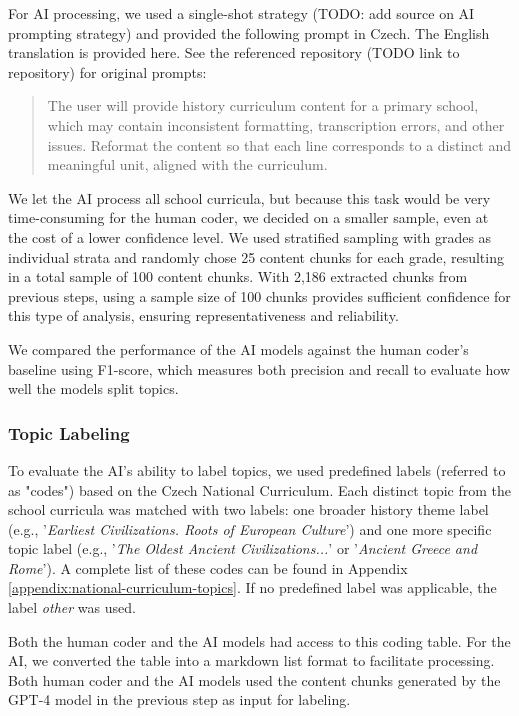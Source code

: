 \documentclass[]{interact}
\theoremstyle{plain}%
\theoremstyle{definition}
\theoremstyle{remark}
\begin{document}
For AI processing, we used a single-shot strategy (TODO: add source on AI prompting strategy) and provided the following prompt in Czech. The English translation is provided here. See the referenced repository (TODO link to repository) for original prompts:

\begin{quotation}
    The user will provide history curriculum content for a primary school, which may contain inconsistent formatting, transcription errors, and other issues. Reformat the content so that each line corresponds to a distinct and meaningful unit, aligned with the curriculum.
\end{quotation}


We let the AI process all school curricula, but because this task would be very time-consuming for the human coder, we decided on a smaller sample, even at the cost of a lower confidence level. We used stratified sampling with grades as individual strata and randomly chose 25 content chunks for each grade, resulting in a total sample of 100 content chunks. With 2,186 extracted chunks from previous steps, using a sample size of 100 chunks provides sufficient confidence for this type of analysis, ensuring representativeness and reliability.

We compared the performance of the AI models against the human coder’s baseline using F1-score, which measures both precision and recall to evaluate how well the models split topics.


\subsubsection{Topic Labeling}

To evaluate the AI’s ability to label topics, we used predefined labels (referred to as "codes") based on the Czech National Curriculum. Each distinct topic from the school curricula was matched with two labels: one broader history theme label (e.g., '\textit{Earliest Civilizations. Roots of European Culture}') and one more specific topic label (e.g., '\textit{The Oldest Ancient Civilizations...}' or '\textit{Ancient Greece and Rome}'). A complete list of these codes can be found in Appendix \ref{appendix:national-curriculum-topics}. If no predefined label was applicable, the label \textit{other} was used.

Both the human coder and the AI models had access to this coding table. For the AI, we converted the table into a markdown list format to facilitate processing. Both human coder and the AI models used the content chunks generated by the GPT-4 model in the previous step as input for labeling.
\end{document}
